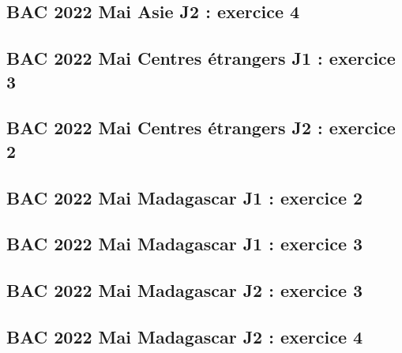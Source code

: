 \documentclass[lang=fr,edition=teacher,layout=sheet]{mxbook}
\begin{document}
\begingroup\endgroup
\par\bigskip
{}\subsection*{BAC 2022 Mai Asie J2 : exercice 4}
\begingroup\endgroup
\par\bigskip
{}\subsection*{BAC 2022 Mai Centres étrangers J1 : exercice 3}
\begingroup\endgroup
\par\bigskip
{}\subsection*{BAC 2022 Mai Centres étrangers J2 : exercice 2}
\begingroup\endgroup
\par\bigskip
{}\subsection*{BAC 2022 Mai Madagascar J1 : exercice 2}
\begingroup\endgroup
\par\bigskip
{}\subsection*{BAC 2022 Mai Madagascar J1 : exercice 3}
\begingroup\endgroup
\par\bigskip
{}\subsection*{BAC 2022 Mai Madagascar J2 : exercice 3}
\begingroup\endgroup
\par\bigskip
{}\subsection*{BAC 2022 Mai Madagascar J2 : exercice 4}
\end{document}
